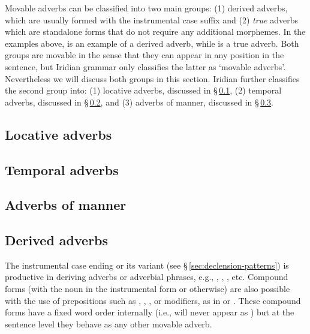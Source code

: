 Movable adverbs can be classified into two main groups: (1) derived adverbs,
which are usually formed with the instrumental case suffix  and (2)
\emph{true} adverbs which are standalone forms that do not require any
additional morphemes. In the examples above,  is an
example of a derived adverb, while  is a true adverb. Both
groups are movable in the sense that they can appear in any position in the
sentence, but Iridian grammar only classifies the latter as `movable adverbs'.
Nevertheless we will discuss both groups in this section. Iridian further
classifies the second group into: (1) locative adverbs, discussed in
\S\,\ref{sec:locative-adverbs}, (2) temporal adverbs, discussed in
\S\,\ref{sec:temporal-adverbs}, and (3) adverbs of manner, discussed in
\S\,\ref{sec:adverbs-of-manner}.

\subsection{Locative adverbs}
\label{sec:locative-adverbs}

\subsection{Temporal adverbs}
\label{sec:temporal-adverbs}

\subsection{Adverbs of manner}
\label{sec:adverbs-of-manner}

\subsection{Derived adverbs}
\label{sec:derived-adverbs}

The instrumental case ending  or its variant  (see
\S\,\ref{sec:declension-patterns}) is productive in deriving adverbs or
adverbial phrases, e.g., , , , etc. Compound forms (with the noun in the
instrumental form or otherwise) are also possible with the use of prepositions
such as , , ,
 or modifiers, as in  or . These compound forms have a fixed word order internally
(i.e.,  will never appear as ) but at the
sentence level they behave as any other movable adverb.

